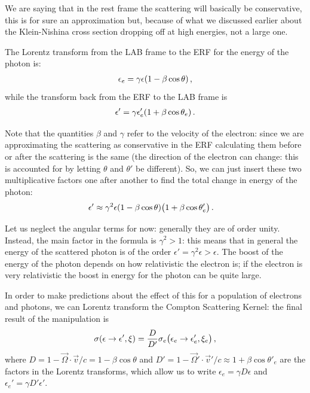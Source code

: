 \documentclass[main.tex]{subfiles}
\begin{document}
We are saying that in the rest frame the scattering will basically be conservative, this is for sure an approximation but, because of what we discussed earlier about the Klein-Nishina cross section dropping off at high energies, not a large one. 

The Lorentz transform from the LAB frame to the ERF for the energy of the photon is: 
%
\begin{align}
\epsilon_e = \gamma \epsilon \qty(1 - \beta \cos \theta )
\,,
\end{align}
%
while the transform back from  the ERF to the LAB frame is 
%
\begin{align}
\epsilon' = \gamma \epsilon_e' \qty(1 + \beta \cos \theta _e )
\,.
\end{align}

Note that the quantities \(\beta \) and \(\gamma \) refer to the velocity of the electron: since we are approximating the scattering as conservative in the ERF calculating them before or after the scattering is the same (the direction of the electron can change: this is accounted for by letting \(\theta\) and \(\theta '\) be different). 
So, we can just insert these two multiplicative factors one after another to find the total change in energy of the photon: 
%
\begin{align}
\epsilon ' &\approx \gamma^2 \epsilon \qty(1 - \beta \cos \theta ) \qty(1 + \beta \cos \theta'_e ) 
\,.
\end{align}


Let us neglect the angular terms for now: generally they are of order unity. Instead, the main factor in the formula is \(\gamma^2>1\): this means that in general the energy of the scattered photon is of the order \(\epsilon ' = \gamma^2 \epsilon > \epsilon  \). 
The boost of the energy of the photon depends on how relativistic the electron is; if the electron is very relativistic the boost in energy for the photon can be quite large. 

In order to make predictions about the effect of this for a population of electrons and photons, we can Lorentz transform the Compton Scattering Kernel: the final result of the manipulation is
%
\begin{align}
\sigma (\epsilon \to \epsilon ', \xi ) = \frac{D}{D'} \sigma_e \qty(\epsilon _e \to \epsilon _e', \xi _e)
\,,
\end{align}
%
where \(D = 1 - \vec{\Omega} \cdot \vec{v} / c = 1 - \beta \cos \theta \) and \(D' = 1 - \vec{\Omega}' \cdot \vec{v}' / c \approx 1 + \beta \cos \theta '_e\) are the factors in the Lorentz transforms, which allow us to write \(\epsilon _e = \gamma D \epsilon \) and \(\epsilon _e' = \gamma D' \epsilon '\).
\end{document}
